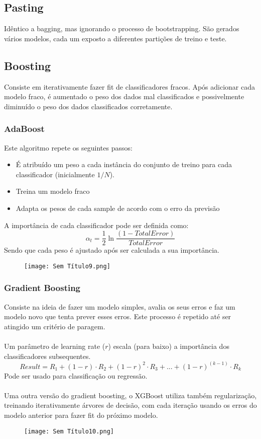 \documentclass[10pt,a4paper]{report}
\begin{document}
\subsection{Pasting}
Idêntico a bagging, mas ignorando o processo de bootstrapping. São gerados vários modelos, cada um exposto a diferentes partições de treino e teste.
\subsection{Boosting}
Consiste em iterativamente fazer fit de classificadores fracos. Após adicionar cada modelo fraco, é aumentado o peso dos dados mal classificados e possivelmente diminuído o peso dos dados classificados corretamente.
\subsubsection{AdaBoost}
Este algoritmo repete os seguintes passos:
\begin{itemize}
\item É atribuído um peso a cada instância do conjunto de treino para cada classificador (inicialmente $1/N$).
\item Treina um modelo fraco
\item Adapta os pesos de cada sample de acordo com o erro da previsão
\end{itemize}
A importância de cada classificador pode ser definida como:
$$
\alpha_t = \frac{1}{2} \ln \frac{(1-TotalError)}{TotalError}
$$
Sendo que cada peso é ajustado após ser calculada a sua importância.
\begin{figure}[H]
\centering
\texttt{[image: Sem Título9.png]}
\end{figure}
\subsubsection{Gradient Boosting}
Consiste na ideia de fazer um modelo simples, avalia os seus erros e faz um modelo novo que tenta prever esses erros. Este processo é repetido até ser atingido um critério de paragem.\\
\\
Um parâmetro de learning rate ($r$) escala (para baixo) a importância dos classificadores subsequentes.
$$
Result = R_1 + (1-r)\cdot R_2 + (1-r)^2 \cdot R_3 + ... + (1-r)^{(k-1)}\cdot R_k
$$
Pode ser usado para classificação ou regressão.\\
\\
Uma outra versão do gradient boosting, o XGBoost utiliza também regularização, treinando iterativamente árvores de decisão, com cada iteração usando os erros do modelo anterior para fazer fit do próximo modelo.
\begin{figure}[H]
\centering
\texttt{[image: Sem Título10.png]}
\end{figure}
\end{document}
